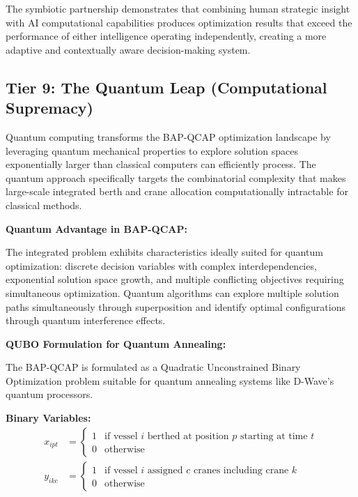 \documentclass{article}
\begin{document}
The symbiotic partnership demonstrates that combining human strategic insight with AI computational capabilities produces optimization results that exceed the performance of either intelligence operating independently, creating a more adaptive and contextually aware decision-making system.

\subsection{Tier 9: The Quantum Leap (Computational Supremacy)}

Quantum computing transforms the BAP-QCAP optimization landscape by leveraging quantum mechanical properties to explore solution spaces exponentially larger than classical computers can efficiently process. The quantum approach specifically targets the combinatorial complexity that makes large-scale integrated berth and crane allocation computationally intractable for classical methods.

\textbf{Quantum Advantage in BAP-QCAP:}

The integrated problem exhibits characteristics ideally suited for quantum optimization: discrete decision variables with complex interdependencies, exponential solution space growth, and multiple conflicting objectives requiring simultaneous optimization. Quantum algorithms can explore multiple solution paths simultaneously through superposition and identify optimal configurations through quantum interference effects.

\textbf{QUBO Formulation for Quantum Annealing:}

The BAP-QCAP is formulated as a Quadratic Unconstrained Binary Optimization problem suitable for quantum annealing systems like D-Wave's quantum processors.

\textbf{Binary Variables:}
\begin{align}
x_{ipt} &= \begin{cases} 1 & \text{if vessel } i \text{ berthed at position } p \text{ starting at time } t \\ 0 & \text{otherwise} \end{cases} \\
y_{ikc} &= \begin{cases} 1 & \text{if vessel } i \text{ assigned } c \text{ cranes including crane } k \\ 0 & \text{otherwise} \end{cases}
\end{align}
\end{document}
